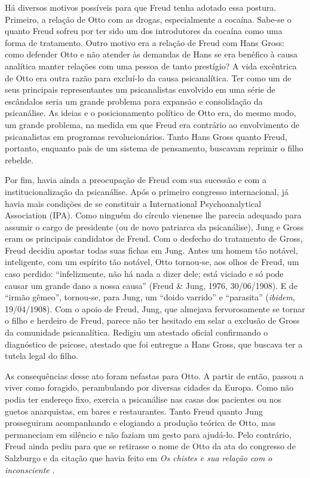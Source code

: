 Há diversos motivos possíveis para que Freud tenha adotado essa postura.
Primeiro, a relação de Otto com as drogas, especialmente a cocaína.
Sabe-se o quanto Freud sofreu por ter sido um dos introdutores da
cocaína como uma forma de tratamento. Outro motivo era a relação de
Freud com Hans Gross: como defender Otto e não atender às demandas de
Hans se era benéfico à causa analítica manter relações com uma pessoa de
tanto prestígio? A vida excêntrica de Otto era outra razão para
excluí-lo da causa psicanalítica. Ter como um de seus principais
representantes um psicanalistas envolvido em uma série de escândalos
seria um grande problema para expansão e consolidação da psicanálise. As
ideias e o posicionamento político de Otto era, do mesmo modo, um grande
problema, na medida em que Freud era contrário ao envolvimento de
psicanalistas em programas revolucionários. Tanto Hans Gross quanto
Freud, portanto, enquanto pais de um sistema de pensamento, buscavam
reprimir o filho rebelde.

Por fim, havia ainda a preocupação de Freud com sua sucessão e com a
institucionalização da psicanálise. Após o primeiro congresso
internacional, já havia mais condições de se constituir a International
Psychoanalytical Association (IPA). Como ninguém do círculo vienense lhe
parecia adequado para assumir o cargo de presidente (ou de novo
patriarca da psicanálise), Jung e Gross eram os principais candidatos de
Freud. Com o desfecho do tratamento de Gross, Freud decidiu apostar
todas suas fichas em Jung. Antes um homem tão notável, inteligente, com
um espírito tão notável, Otto tornou-se, aos olhos de Freud, um caso
perdido: ``infelizmente, não há nada a dizer dele; está viciado e só
pode causar um grande dano a nossa causa'' (Freud \& Jung, 1976,
30/06/1908). E de ``irmão gêmeo'', tornou-se, para Jung, um ``doido
varrido'' e ``parasita'' (\emph{ibidem}, 19/04/1908). Com o apoio de
Freud, Jung, que almejava fervorosamente se tornar o filho e herdeiro de
Freud, parece não ter hesitado em selar a exclusão de Gross da
comunidade psicanalítica. Redigiu um atestado oficial confirmando o
diagnóstico de psicose, atestado que foi entregue a Hans Gross, que
buscava ter a tutela legal do filho.

As consequências desse ato foram nefastas para Otto. A partir de então,
passou a viver como foragido, perambulando por diversas cidades da
Europa. Como não podia ter endereço fixo, exercia a psicanálise nas
casas dos pacientes ou nos guetos anarquistas, em bares e restaurantes.
Tanto Freud quanto Jung prosseguiram acompanhando e elogiando a produção
teórica de Otto, mas permaneciam em silêncio e não faziam um gesto para
ajudá-lo. Pelo contrário, Freud ainda pediu para que se retirasse o nome
de Otto da ata do congresso de Salzburgo e da citação que havia feito em
\emph{Os chistes e sua relação com o inconsciente} .

